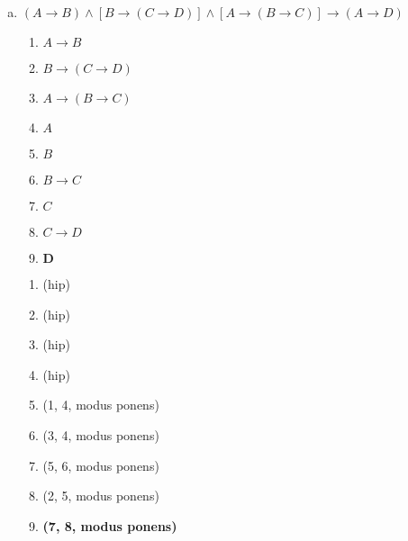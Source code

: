 \begin{Gabarito}{11}
\begin{enumerate}[a)]
\begin{multicols}{2}
        \begin{enumerate}[1.]
          \item $A' \rightarrow B'$
          \item $B$
          \item $A \rightarrow C$
          \item $A$
          \item $\boldsymbol{C}$
        \end{enumerate}

        \columnbreak

        \begin{enumerate}[\ding{32}]
          \item (hip)
          \item (hip)
          \item (hip)
          \item (1, 2, modus tollens)
          \item \textbf{(3, 4, modus ponens)}
        \end{enumerate}

      \end{multicols}

      \item $(A \rightarrow B) \wedge [B \rightarrow (C \rightarrow D)] \wedge [A \rightarrow (B \rightarrow C)] \rightarrow (A \rightarrow D)$ \\
      \begin{multicols}{2}

        \begin{enumerate}[1.]
          \item $A \rightarrow B$
          \item $B \rightarrow (C \rightarrow D)$
          \item $A \rightarrow (B \rightarrow C)$
          \item $A$
          \item $B$
          \item $B \rightarrow C$
          \item $C$
          \item $C \rightarrow D$
          \item $\boldsymbol{D}$
        \end{enumerate}

        \columnbreak

        \begin{enumerate}[\ding{32}]
          \item (hip)
          \item (hip)
          \item (hip)
          \item (hip)
          \item (1, 4, modus ponens)
          \item (3, 4, modus ponens)
          \item (5, 6, modus ponens)
          \item (2, 5, modus ponens)
          \item \textbf{(7, 8, modus ponens)}
        \end{enumerate}


\end{multicols}
\end{enumerate}
\end{Gabarito}
